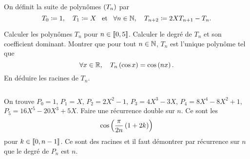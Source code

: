 \documentclass{magnolia}
\begin{document}
On définit la suite de polynômes $\left(T_n\right)$ par
\[T_0\coloneqq 1, \quad T_1\coloneqq X \quad\!\text{et}\quad\! \forall n\in\mathbb{N} ,\quad T_{n+2}\coloneqq 2XT_{n+1}-T_n.\]
\begin{questions}
\question Calculer les polynômes $T_n$ pour $n\in\left\llbracket 0,5\right\rrbracket$.
\question Calculer le degré de $T_n$ et son coefficient dominant.
\question Montrer que pour tout $n\in\mathbb{N}$, $T_n$ est l'unique polynôme
  tel que
  \[\forall x\in\mathbb{R} ,\quad T_n\left(\cos x\right)=\cos\left(nx\right).\]
\question En déduire les racines de $T_n$.
\end{questions}
\begin{sol}
$\quad$
\begin{questions}
\question On trouve $P_0=1$, $P_1=X$, $P_2=2X^2-1$, $P_3=4X^3-3X$,
  $P_4=8X^4-8X^2+1$, $P_5=16X^5-20X^3+5X$.
\question Faire une récurrence double sur $n$.
\question Ce sont les
  \[\cos\left(\frac{\pi}{2n}\left(1+2k\right)\right)\]
  pour $k\in\left\llbracket 0,n-1\right\rrbracket$. Ce sont des racines et il faut démontrer par
  récurrence sur $n$ que le degré de $P_n$ est $n$.
\end{questions}
\end{sol}





\end{document}
